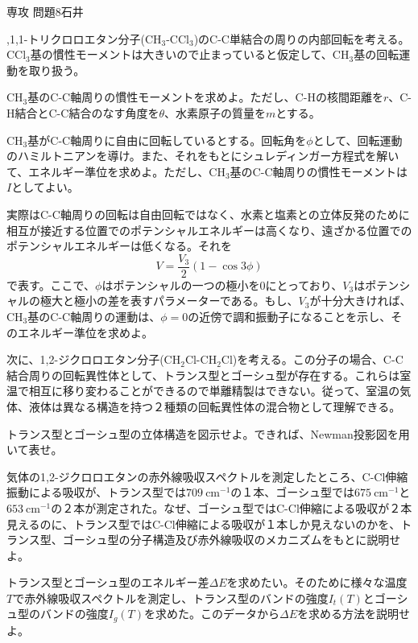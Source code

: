 \documentclass[fleqn]{jbook}
\begin{document}
\begin{question}{専攻 問題8}{石井}
\begin{subquestions}

,1,1-トリクロロエタン分子(CH$_{3}$-CCl$_{3}$)のC-C単結合の周りの内部回転を考える。CCl$_{3}$基の慣性モーメントは大きいので止まっていると仮定して、CH$_{3}$基の回転運動を取り扱う。
\begin{subsubquestions}
\SubSubQuestion
CH$_{3}$基のC-C軸周りの慣性モーメントを求めよ。ただし、C-Hの核間距離を$r$、C-H結合とC-C結合のなす角度を$\theta$、水素原子の質量を$m$とする。

\SubSubQuestion
CH$_{3}$基がC-C軸周りに自由に回転しているとする。回転角を$\phi$として、回転運動のハミルトニアンを導け。また、それをもとにシュレディンガー方程式を解いて、エネルギー準位を求めよ。ただし、CH$_{3}$基のC-C軸周りの慣性モーメントは$I$としてよい。

\SubSubQuestion
実際はC-C軸周りの回転は自由回転ではなく、水素と塩素との立体反発のために相互が接近する位置でのポテンシャルエネルギーは高くなり、遠ざかる位置でのポテンシャルエネルギーは低くなる。それを
\[   V = \frac{V_{3}}{2}(1- \cos 3 \phi )  \]
で表す。ここで、$\phi$はポテンシャルの一つの極小を0にとっており、$V_{3}$はポテンシャルの極大と極小の差を表すパラメーターである。もし、$V_{3}$が十分大きければ、CH$_{3}$基のC-C軸周りの運動は、$\phi=0$の近傍で調和振動子になることを示し、そのエネルギー準位を求めよ。
\end{subsubquestions}

\SubQuestion
次に、1,2-ジクロロエタン分子(CH$_{2}$Cl-CH$_{2}$Cl)を考える。この分子の場合、C-C結合周りの回転異性体として、トランス型とゴーシュ型が存在する。これらは室温で相互に移り変わることができるので単離精製はできない。従って、室温の気体、液体は異なる構造を持つ２種類の回転異性体の混合物として理解できる。
\begin{subsubquestions}
\SubSubQuestion
トランス型とゴーシュ型の立体構造を図示せよ。できれば、Newman投影図を用いて表せ。

\SubSubQuestion
気体の1,2-ジクロロエタンの赤外線吸収スペクトルを測定したところ、C-Cl伸縮振動による吸収が、トランス型では$709~\text{cm}^{-1}$の１本、ゴーシュ型では$675~\text{cm}^{-1}$と$653~\text{cm}^{-1}$の２本が測定された。なぜ、ゴーシュ型ではC-Cl伸縮による吸収が２本見えるのに、トランス型ではC-Cl伸縮による吸収が１本しか見えないのかを、トランス型、ゴーシュ型の分子構造及び赤外線吸収のメカニズムをもとに説明せよ。

\SubSubQuestion
トランス型とゴーシュ型のエネルギー差$\Delta E$を求めたい。そのために様々な温度$T$で赤外線吸収スペクトルを測定し、トランス型のバンドの強度$I_{t}(T)$とゴーシュ型のバンドの強度$I_{g}(T)$を求めた。このデータから$\Delta E$を求める方法を説明せよ。


\end{subsubquestions}
\end{subquestions}
\end{question}
\end{document}
